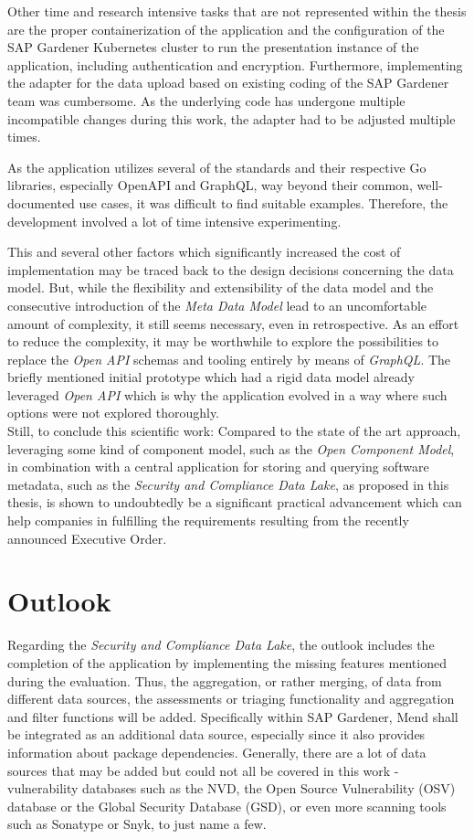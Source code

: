 Other time and research intensive tasks that are not represented within the thesis are the proper containerization of the application and the configuration of the SAP Gardener Kubernetes cluster to run the presentation instance of the application, including authentication and encryption. Furthermore, implementing the adapter for the data upload based on existing coding of the SAP Gardener team was cumbersome. As the underlying code has undergone multiple incompatible changes during this work, the adapter had to be adjusted multiple times.\par
As the application utilizes several of the standards and their respective Go libraries, especially OpenAPI and GraphQL, way beyond their common, well-documented use cases, it was difficult to find suitable examples. Therefore, the development involved a lot of time intensive experimenting.\par
This and several other factors which significantly increased the cost of implementation may be traced back to the design decisions concerning the data model.  But, while the flexibility and extensibility of the data model and the consecutive introduction of the \emph{Meta Data Model} lead to an uncomfortable amount of complexity, it still seems necessary, even in retrospective. As an effort to reduce the complexity, it may be worthwhile to explore the possibilities to replace the \emph{Open API} schemas and tooling entirely by means of \emph{GraphQL}. The briefly mentioned initial prototype which had a rigid data model already leveraged \emph{Open API} which is why the application evolved in a way where such options were not explored thoroughly.\\

Still, to conclude this scientific work: Compared to the state of the art approach, leveraging some kind of component model, such as the \emph{Open Component Model}, in combination with a central application for storing and querying software metadata, such as the \emph{Security and Compliance Data Lake}, as proposed in this thesis, is shown to undoubtedly be a significant practical advancement which can help companies in fulfilling the requirements resulting from the recently announced Executive Order. 

\section{Outlook}
Regarding the \emph{Security and Compliance Data Lake}, the outlook includes the completion of the application by implementing the missing features mentioned during the evaluation. Thus, the aggregation, or rather merging, of data from different data sources, the assessments or triaging functionality and aggregation and filter functions will be added. Specifically within SAP Gardener, Mend shall be integrated as an additional data source, especially since it also provides information about package dependencies. Generally, there are a lot of data sources that may be added but could not all be covered in this work - vulnerability databases such as the NVD, the Open Source Vulnerability (OSV) database or the Global Security Database (GSD), or even more scanning tools such as Sonatype or Snyk, to just name a few.\\
 

